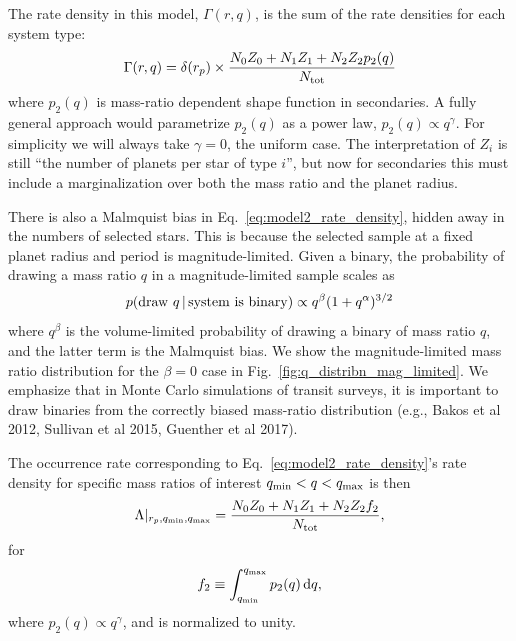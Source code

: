 The rate density in this model, $\Gamma(r,q)$, is the sum of the rate 
densities for each system type:
\begin{equation}
\Gamma(r,q)
=
\delta(r_p) \times 
\frac{N_0 Z_0 + N_1 Z_1 + N_2 Z_2 p_2(q)}{N_{\rm tot}}
\label{eq:model2_rate_density}
\end{equation}
where $p_2(q)$ is mass-ratio dependent shape function in secondaries. A fully 
general approach would parametrize $p_2(q)$ as a power law, $p_2(q) \propto 
q^\gamma$. For simplicity we will always take $\gamma=0$, the uniform case.
The interpretation of $Z_i$ is still ``the number of planets per star of 
type $i$'', but now for secondaries this must include a marginalization 
over both the mass ratio and the planet radius.

There is also a Malmquist bias in Eq.~\ref{eq:model2_rate_density}, hidden 
away in the numbers of selected stars.
This is because the selected sample at a fixed planet radius and period is 
magnitude-limited.
Given a binary, the probability of drawing a mass ratio $q$ in a 
magnitude-limited sample scales as
\begin{equation}
p({\rm draw\ }q\,|\,{\rm system\ is\ binary}) \propto q^\beta 
(1+q^\alpha)^{3/2}
\label{eq:Malmquist_bias}
\end{equation}
where $q^\beta$ is the volume-limited probability of drawing a binary of mass 
ratio $q$, and the latter term is the Malmquist bias.
We show the magnitude-limited mass ratio distribution for the $\beta=0$ case 
in Fig.~\ref{fig:q_distribn_mag_limited}.
We emphasize that in Monte Carlo simulations of transit surveys, it is 
important to draw binaries from the correctly biased mass-ratio distribution 
(e.g., Bakos et al 2012, Sullivan et al 2015, Guenther et al 2017).

The occurrence rate corresponding to Eq.~\ref{eq:model2_rate_density}'s rate 
density for specific mass ratios of interest $q_{\rm min} < q < q_{\rm 
max}$ is then
\begin{equation}
\Lambda|_{r_p,q_{\rm min},q_{\rm max}} = 
\frac{N_0 Z_0 + N_1 Z_1 + N_2 Z_2 f_2}
{N_{\rm tot}},
\end{equation}
for
\begin{equation}
f_2 \equiv
\int_{q_{\rm min}}^{q_{\rm max}} p_2(q) \,{\rm d}q,
\end{equation}
where $p_2(q)\propto q^\gamma$, and is normalized to unity.


